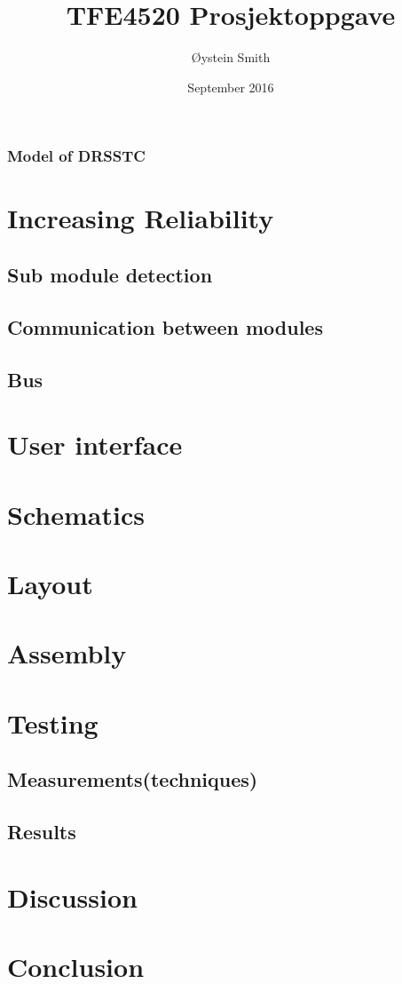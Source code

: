 \documentclass{article}
\title{TFE4520 Prosjektoppgave}
\author{Øystein Smith}
\date{September 2016}
\begin{document}
\maketitle



\subsubsection{Model of DRSSTC}





\section{Increasing Reliability}
\subsection{Sub module detection}
\subsection{Communication between modules}
\subsection{Bus}
\section{User interface}
\section{Schematics}
\section{Layout}
\section{Assembly}
\section{Testing}
\subsection{Measurements(techniques)}
\subsection{Results}
\section{Discussion}
\section{Conclusion}
\end{document}
